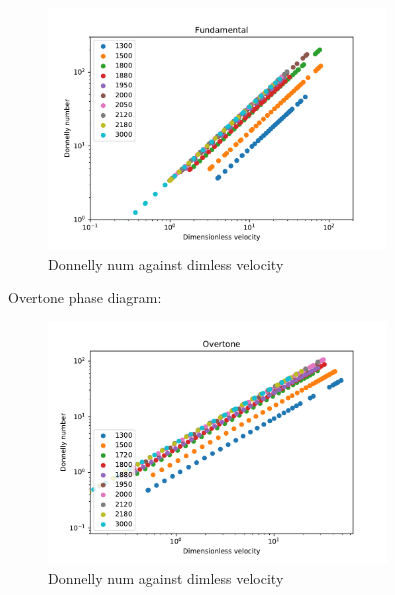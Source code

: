 \begin{figure}[h]
	\centering
	\includegraphics[width=0.8\textwidth]{graphics/results/fund-phase}
	\caption{Donnelly num against dimless velocity}
	\label{fund_phase}
\end{figure}

Overtone phase diagram:

\begin{figure}[h]
	\centering
	\includegraphics[width=0.8\textwidth]{graphics/results/over-phase}
	\caption{Donnelly num against dimless velocity}
	\label{over_phase}
\end{figure}


\newpage
